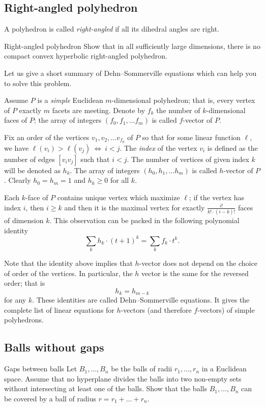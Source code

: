 \subsection*{Right-angled polyhedron\thm}

A polyhedron is called {}\emph{right-angled} if all its dihedral angles are right.

\begin{pr}{\thm}{Right-angled polyhedron}\label{Right-angled polyhedron}
Show that in all sufficiently large dimensions, there is no compact convex hyperbolic right-angled polyhedron. 
\end{pr}

Let us give a short summary of Dehn--Sommerville equations 
which can help you to solve this problem.

Assume $P$ is a \emph{simple} Euclidean $m$-dimensional polyhedron;
that is, every vertex of $P$ exactly $m$ facets are meeting.
Denote by $f_k$ the number of $k$-dimensional faces of $P$;
the array of integers $(f_0,f_1,\dots f_m)$ is called $f$-vector of $P$.

Fix an order of the vertices $v_1,v_2,\dots v_{f_0}$
of $P$ so that for some linear function $\ell$, we have $\ell(v_i)>\ell(v_j)\ \Leftrightarrow\ i<j$.
The \emph{index} of the vertex $v_i$ 
is defined as the number of edges $[v_iv_j]$ such that $i<j$. 
The number of vertices of given index $k$ will be denoted as $h_k$.
The array of integers $(h_0,h_1,\dots h_m)$ is called $h$-vector of $P$.
Clearly $h_0=h_m=1$ and $h_k\ge 0$ for all $k$.

Each $k$-face of $P$ contains unique vertex which maximize $\ell$;
if the vertex has index $i$,
then $i\ge k$ and
then it is the maximal vertex for exactly $\tfrac{i!}{k!\cdot (i-k)!}$
faces of dimension $k$.
This observation can be packed in the following polynomial identity 
\[\sum_k h_k\cdot (t+1)^k=\sum_k f_k\cdot t^k.\]

Note that the identity above implies that $h$-vector does not depend on the choice of order of the vertices.
In particular, the $h$ vector is the same for the reversed order;
that is
\[h_k=h_{m-k}\]
for any $k$.
These identities are called Dehn--Sommerville equations.
It gives the complete list of linear equations for $h$-vectors (and therefore $f$-vectors) of simple polyhedrons.

\subsection*{Balls without gaps}
\label{Balls without gaps}
\begin{pr}{}{Gaps between balls}
Let $B_1,\dots,B_n$ be the balls  
of radii $r_1,\dots,r_n$ 
in a Euclidean space.
Assume that no hyperplane divides the balls into two
non-empty sets without intersecting at least one of the balls. 
Show that the balls
$B_1,\dots,B_n$ can be covered by a ball of radius
$r=r_1+\dots+r_n$.

\end{pr}



